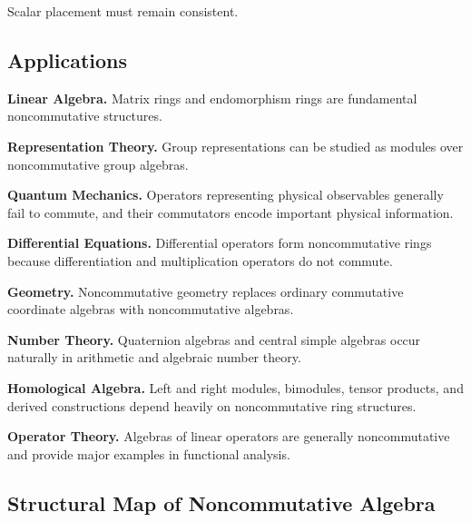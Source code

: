 Scalar placement must remain consistent.

\subsection{Applications}
\label{subsec:noncommutative-applications}

\begin{applicationbox}
\textbf{Linear Algebra.}
Matrix rings and endomorphism rings are fundamental noncommutative
structures.

\medskip

\textbf{Representation Theory.}
Group representations can be studied as modules over noncommutative group
algebras.

\medskip

\textbf{Quantum Mechanics.}
Operators representing physical observables generally fail to commute, and
their commutators encode important physical information.

\medskip

\textbf{Differential Equations.}
Differential operators form noncommutative rings because differentiation and
multiplication operators do not commute.

\medskip

\textbf{Geometry.}
Noncommutative geometry replaces ordinary commutative coordinate algebras
with noncommutative algebras.

\medskip

\textbf{Number Theory.}
Quaternion algebras and central simple algebras occur naturally in arithmetic
and algebraic number theory.

\medskip

\textbf{Homological Algebra.}
Left and right modules, bimodules, tensor products, and derived constructions
depend heavily on noncommutative ring structures.

\medskip

\textbf{Operator Theory.}
Algebras of linear operators are generally noncommutative and provide major
examples in functional analysis.
\end{applicationbox}

\subsection{Structural Map of Noncommutative Algebra}
\label{subsec:noncommutative-structural-map}

